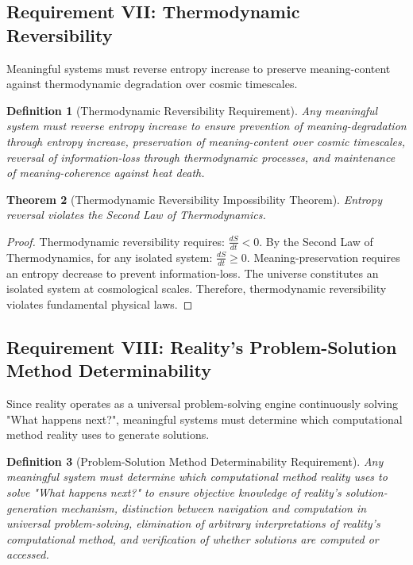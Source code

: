 \documentclass[12pt,a4paper]{article}
\newtheorem{theorem}{Theorem}[section]
\newtheorem{definition}[theorem]{Definition}
\begin{document}
\subsection{Requirement VII: Thermodynamic Reversibility}

Meaningful systems must reverse entropy increase to preserve meaning-content against thermodynamic degradation over cosmic timescales.

\begin{definition}[Thermodynamic Reversibility Requirement]
Any meaningful system must reverse entropy increase to ensure prevention of meaning-degradation through entropy increase, preservation of meaning-content over cosmic timescales, reversal of information-loss through thermodynamic processes, and maintenance of meaning-coherence against heat death.
\end{definition}

\begin{theorem}[Thermodynamic Reversibility Impossibility Theorem]
Entropy reversal violates the Second Law of Thermodynamics.
\end{theorem}

\begin{proof}
Thermodynamic reversibility requires: $\frac{dS}{dt} < 0$. By the Second Law of Thermodynamics, for any isolated system: $\frac{dS}{dt} \geq 0$. Meaning-preservation requires an entropy decrease to prevent information-loss. The universe constitutes an isolated system at cosmological scales. Therefore, thermodynamic reversibility violates fundamental physical laws.
\end{proof}

\subsection{Requirement VIII: Reality's Problem-Solution Method Determinability}

Since reality operates as a universal problem-solving engine continuously solving "What happens next?", meaningful systems must determine which computational method reality uses to generate solutions.

\begin{definition}[Problem-Solution Method Determinability Requirement]
Any meaningful system must determine which computational method reality uses to solve "What happens next?" to ensure objective knowledge of reality's solution-generation mechanism, distinction between navigation and computation in universal problem-solving, elimination of arbitrary interpretations of reality's computational method, and verification of whether solutions are computed or accessed.
\end{definition}
\end{document}
